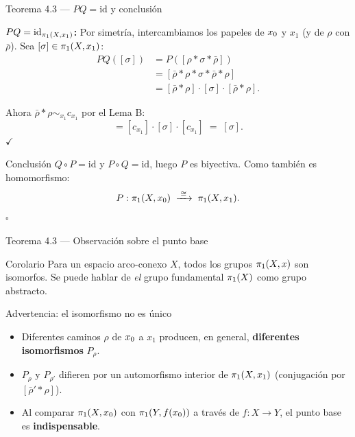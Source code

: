 \begin{frame}{Teorema 4.3 — $PQ = \mathrm{id}$ y conclusión}

  \textbf{$PQ = \mathrm{id}_{\pi_1(X,x_1)}$:} Por simetría, intercambiamos
  los papeles de $x_0$ y $x_1$ (y de $\rho$ con $\bar{\rho}$).
  Sea $[\sigma] \in \pi_1(X,x_1)$:
  \begin{align*}
    PQ([\sigma])
      &= P\!\left([\rho*\sigma*\bar{\rho}]\right) \\
      &= [\bar{\rho}*\rho*\sigma*\bar{\rho}*\rho] \\
      &= [\bar{\rho}*\rho] \cdot [\sigma] \cdot [\bar{\rho}*\rho].
  \end{align*}

  Ahora $\bar{\rho}*\rho \sim_{x_1} c_{x_1}$ por el Lema B:
  \[
    = [c_{x_1}] \cdot [\sigma] \cdot [c_{x_1}] \;=\; [\sigma].
  \]
  \hfill $\checkmark$

  \begin{block}{Conclusión}
    $Q \circ P = \mathrm{id}$ y $P \circ Q = \mathrm{id}$, luego $P$ es
    biyectiva. Como también es homomorfismo:
    \[
      P : \pi_1(X, x_0) \;\xrightarrow{\;\cong\;}\; \pi_1(X, x_1).
    \]
    \hfill $\square$
  \end{block}

\end{frame}

\begin{frame}{Teorema 4.3 — Observación sobre el punto base}

  \begin{exampleblock}{Corolario}
    Para un espacio arco-conexo $X$, todos los grupos $\pi_1(X,x)$
    son isomorfos. Se puede hablar de \emph{el} grupo fundamental
    $\pi_1(X)$ como grupo abstracto.
  \end{exampleblock}

  \bigskip
  \begin{alertblock}{Advertencia: el isomorfismo no es único}
    \begin{itemize}
      \item Diferentes caminos $\rho$ de $x_0$ a $x_1$ producen, en general,
            \textbf{diferentes isomorfismos} $P_\rho$.
      \item $P_\rho$ y $P_{\rho'}$ difieren por un automorfismo interior de
            $\pi_1(X,x_1)$ (conjugación por $[\bar{\rho}' * \rho]$).
      \item Al comparar $\pi_1(X,x_0)$ con $\pi_1(Y,f(x_0))$ a través de
            $f : X \to Y$, el punto base es \textbf{indispensable}.
    \end{itemize}
  \end{alertblock}

\end{frame}
